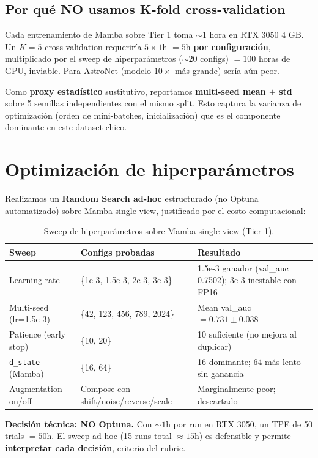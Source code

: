 \documentclass[11pt, a4paper]{article}
\begin{document}
\subsection{Por qué NO usamos K-fold cross-validation}

Cada entrenamiento de Mamba sobre Tier 1 toma $\sim 1$ hora en RTX 3050 4 GB. Un $K=5$ cross-validation requeriría $5 \times 1$h $= 5$h \textbf{por configuración}, multiplicado por el sweep de hiperparámetros ($\sim 20$ configs) $= 100$ horas de GPU, inviable. Para AstroNet (modelo $10\times$ más grande) sería aún peor.

Como \textbf{proxy estadístico} sustitutivo, reportamos \textbf{multi-seed mean $\pm$ std} sobre 5 semillas independientes con el mismo split. Esto captura la varianza de optimización (orden de mini-batches, inicialización) que es el componente dominante en este dataset chico.

\section{Optimización de hiperparámetros}

Realizamos un \textbf{Random Search ad-hoc} estructurado (no Optuna automatizado) sobre Mamba single-view, justificado por el costo computacional:

\begin{table}[h]
\centering
\small
\begin{tabular}{lll}
\toprule
Sweep & Configs probadas & Resultado \\
\midrule
Learning rate & \{1e-3, 1.5e-3, 2e-3, 3e-3\} & 1.5e-3 ganador (val\_auc 0.7502); 3e-3 inestable con FP16 \\
Multi-seed (lr=1.5e-3) & \{42, 123, 456, 789, 2024\} & Mean val\_auc $= 0.731 \pm 0.038$ \\
Patience (early stop) & \{10, 20\} & 10 suficiente (no mejora al duplicar) \\
\texttt{d\_state} (Mamba) & \{16, 64\} & 16 dominante; 64 más lento sin ganancia \\
Augmentation on/off & Compose con shift/noise/reverse/scale & Marginalmente peor; descartado \\
\bottomrule
\end{tabular}
\caption{Sweep de hiperparámetros sobre Mamba single-view (Tier 1).}
\end{table}

\begin{keybox}
\textbf{Decisión técnica: NO Optuna.} Con $\sim 1$h por run en RTX 3050, un TPE de 50 trials $= 50$h. El sweep ad-hoc (15 runs total $\approx 15$h) es defensible y permite \textbf{interpretar cada decisión}, criterio del rubric.
\end{keybox}
\end{document}
